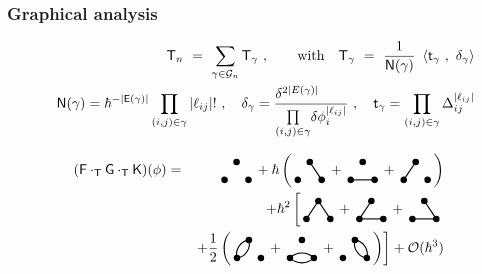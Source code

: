 \documentclass[9pt]{beamer}
\newcommand{\sm}[1]{\left\langle #1 \right\rangle}
\newcommand{\abs}[1]{\left|{#1}\right|}
\newcommand{\Gcal}{\mathcal{G}}
\newcommand{\Esf}{\mathsf{E}}
\newcommand{\Fsf}{\mathsf{F}}
\newcommand{\Gsf}{\mathsf{G}}
\newcommand{\Ksf}{\mathsf{K}}
\newcommand{\Nsf}{\mathsf{N}}
\newcommand{\Tsf}{\mathsf{T}}
\newcommand{\tsf}{\mathsf{t}}
\newcommand{\FGH}{\begin{tikzpicture}[thick,scale=1.5]
\useasboundingbox (-0.1,0.1) rectangle (0.5,0.4);
\filldraw (0,0) circle (1.3pt);
\filldraw (0.4,0) circle (1.3pt);
\filldraw (0.2,0.3) circle (1.3pt);
\end{tikzpicture} }
\newcommand{\FoneGHF}{\begin{tikzpicture}[thick,scale=1.5]
\useasboundingbox (-0.1,0.1) rectangle (0.5,0.4);
\filldraw (0,0) circle (1.3pt);
\filldraw (0.4,0) circle (1.3pt);
\filldraw (0.2,0.3) circle (1.3pt);
\draw (0.2,0.3) -- (0.4,0);
\end{tikzpicture} }
\newcommand{\FGoneHF}{\begin{tikzpicture}[thick,scale=1.5]
\useasboundingbox (-0.1,0.1) rectangle (0.5,0.4);
\filldraw (0,0) circle (1.3pt);
\filldraw (0.4,0) circle (1.3pt);
\filldraw (0.2,0.3) circle (1.3pt);
\draw (0,0) -- (0.4,0);
\end{tikzpicture} }
\newcommand{\FGHoneF}{\begin{tikzpicture}[thick,scale=1.5]
\useasboundingbox (-0.1,0.1) rectangle (0.5,0.4);
\filldraw (0,0) circle (1.3pt);
\filldraw (0.4,0) circle (1.3pt);
\filldraw (0.2,0.3) circle (1.3pt);
\draw (0,0) -- (0.2,0.3);
\end{tikzpicture} }
\newcommand{\FoneGoneHF}{\begin{tikzpicture}[thick,scale=1.5]
\useasboundingbox (-0.1,0.1) rectangle (0.5,0.4);
\filldraw (0,0) circle (1.3pt);
\filldraw (0.4,0) circle (1.3pt);
\filldraw (0.2,0.3) circle (1.3pt);
\draw (0,0) -- (0.2,0.3);
\draw (0.4,0) -- (0,0);
\end{tikzpicture} }
\newcommand{\FoneGHoneF}{\begin{tikzpicture}[thick,scale=1.5]
\useasboundingbox (-0.1,0.1) rectangle (0.5,0.4);
\filldraw (0,0) circle (1.3pt);
\filldraw (0.4,0) circle (1.3pt);
\filldraw (0.2,0.3) circle (1.3pt);
\draw (0,0) -- (0.2,0.3);
\draw (0.4,0) -- (0.2,0.3);
\end{tikzpicture} }
\newcommand{\FGoneHoneF}{\begin{tikzpicture}[thick,scale=1.5]
\useasboundingbox (-0.1,0.1) rectangle (0.5,0.4);
\filldraw (0,0) circle (1.3pt);
\filldraw (0.4,0) circle (1.3pt);
\filldraw (0.2,0.3) circle (1.3pt);
\draw (0.4,0) -- (0.2,0.3);
\draw (0.4,0) -- (0,0);
\end{tikzpicture} }
\newcommand{\FtwoGHF}{\begin{tikzpicture}[thick,scale=1.5]
\useasboundingbox (-0.1,0.1) rectangle (0.5,0.4);
\filldraw (0,0) circle (1.3pt);
\filldraw (0.4,0) circle (1.3pt);
\filldraw (0.2,0.3) circle (1.3pt);
\draw (0,0) edge [out=105,in=185] node[above] {} (0.2,0.3);
\draw (0,0) edge [out=5,in=-75] node[above] {} (0.2,0.3);
\end{tikzpicture} }
\newcommand{\FGtwoHF}{\begin{tikzpicture}[thick,scale=1.5]
\useasboundingbox (-0.1,0.1) rectangle (0.5,0.4);
\filldraw (0,0) circle (1.3pt);
\filldraw (0.4,0) circle (1.3pt);
\filldraw (0.2,0.3) circle (1.3pt);
\draw (0,0) edge [out=45,in=135] node[above] {} (0.4,0);
\draw (0,0) edge [out=-45,in=-135] node[above] {} (0.4,0);
\end{tikzpicture} }
\newcommand{\FGHtwoF}{\begin{tikzpicture}[thick,scale=1.5]
\useasboundingbox (-0.1,0.1) rectangle (0.5,0.4);
\filldraw (0,0) circle (1.3pt);
\filldraw (0.4,0) circle (1.3pt);
\filldraw (0.2,0.3) circle (1.3pt);
\draw (0.4,0) edge [out=75,in=-5] node[above] {} (0.2,0.3);
\draw (0.4,0) edge [out=-185,in=-105] node[above] {} (0.2,0.3);
\end{tikzpicture} }
\begin{document}

\begin{frame}[label=details_graph]

\frametitle{Graphical analysis}

\vfill

\begin{eqnarray*}
&& \Tsf_n \ = \ \sum_{\gamma \in \Gcal_n} \Tsf_\gamma \ , \qquad \mbox{with} \quad \Tsf_\gamma \ = \ \frac{1}{\Nsf(\gamma)} \ \sm{\tsf_\gamma \ , \ \delta_\gamma} \\
%
&& \Nsf(\gamma) = \hbar^{-\abs{\Esf(\gamma)}} \prod_{(i,j) \in \gamma} \abs{\ell_{ij}} ! \ , \quad 
%
\delta_\gamma = \frac{\delta^{2\abs{E(\gamma)}}\hfill}{\underset{(i,j)\in\gamma}{\prod} \delta \phi_i^{\abs{\ell_{ij}}}} \ , \quad 
%
\tsf_\gamma = \prod_{(i,j)\in\gamma} \Delta_{ij}^{\abs{\ell_{ij}}} 
%
\vspace*{-5pt}
\end{eqnarray*}

\vfill

\begin{eqnarray*}
(\Fsf \cdot_{\Tsf} \Gsf \cdot_{\Tsf} \Ksf)(\phi)
&=& \FGH+\hbar\left(\FoneGHF+\FGoneHF+\FGHoneF\right) \\
&&+\hbar^2\left[\FoneGHoneF+\FoneGoneHF+\FGoneHoneF\right.\\
&&\left.+\frac12\left(\FtwoGHF+\FGtwoHF+\FGHtwoF\right)\right]
+\mathcal{O}(\hbar^3)
\end{eqnarray*}

\vfill

\hfill\hyperlink{graph}{}

\end{frame}

\end{document}
